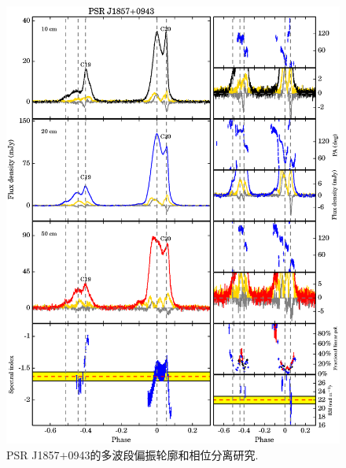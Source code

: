 \begin{figure}
\begin{center}
\includegraphics[width=6 in]{1857.ps}
\caption{PSR J1857$+$0943的多波段偏振轮廓和相位分离研究.}
\label{1857}
\end{center}
\end{figure}


